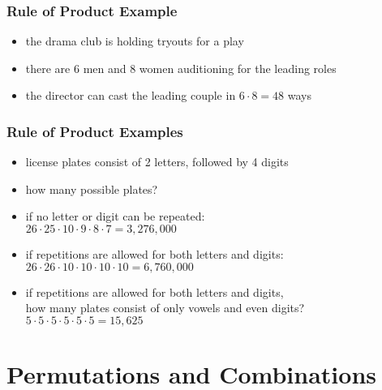 \documentclass[dvipsnames]{beamer}
\begin{document}
\begin{frame}
  \frametitle{Rule of Product Example}

  \begin{example}
    \begin{itemize}
      \item the drama club is holding tryouts for a play
      \item there are 6 men and 8 women auditioning for the leading roles

      \medskip
      \item the director can cast the leading couple in
        $6 \cdot 8 = 48$ ways
    \end{itemize}
  \end{example}
\end{frame}

\begin{frame}
  \frametitle{Rule of Product Examples}

  \begin{example}
    \begin{itemize}
      \item license plates consist of 2 letters, followed by 4 digits
      \item how many possible plates?

      \pause
      \medskip
      \item if no letter or digit can be repeated:\\
        $26 \cdot 25 \cdot 10 \cdot 9 \cdot 8 \cdot 7 = 3,276,000$

      \pause
      \medskip
      \item if repetitions are allowed for both letters and digits:\\
        $26 \cdot 26 \cdot 10 \cdot 10 \cdot 10 \cdot 10 = 6,760,000$

      \pause
      \medskip
      \item if repetitions are allowed for both letters and digits,\\
        how many plates consist of only vowels and even digits?\\
        $5 \cdot 5 \cdot 5 \cdot 5 \cdot 5 \cdot 5 = 15,625$
   \end{itemize}
  \end{example}
\end{frame}

\section{Permutations and Combinations}
\end{document}
